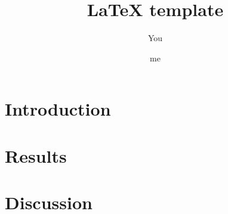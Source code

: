 \documentclass{article}
\title{\LaTeX{} template}
\author{You \and me}
\begin{document}
\maketitle

\section*{Introduction}\label{sec:intro}

\section*{Results}\label{sec:results}

\section*{Discussion}\label{sec:discussion}


\printbibliography
\end{document}
